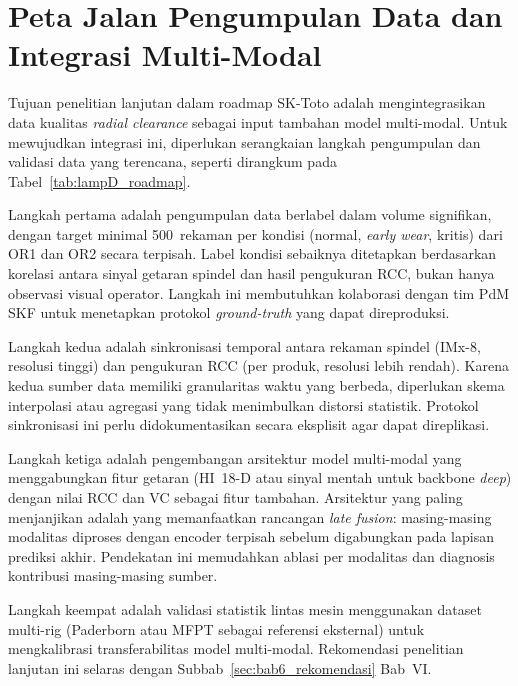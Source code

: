 \section{Peta Jalan Pengumpulan Data dan Integrasi Multi-Modal}
\label{lamp:skf_roadmap}

Tujuan penelitian lanjutan dalam roadmap SK-Toto adalah mengintegrasikan
data kualitas \emph{radial clearance} sebagai input tambahan model
multi-modal. Untuk mewujudkan integrasi ini, diperlukan serangkaian
langkah pengumpulan dan validasi data yang terencana, seperti dirangkum
pada Tabel~\ref{tab:lampD_roadmap}.

Langkah pertama adalah pengumpulan data berlabel dalam volume signifikan,
dengan target minimal 500~rekaman per kondisi (normal, \emph{early
wear}, kritis) dari OR1 dan OR2 secara terpisah. Label kondisi sebaiknya
ditetapkan berdasarkan korelasi antara sinyal getaran spindel dan hasil
pengukuran RCC, bukan hanya observasi visual operator. Langkah ini
membutuhkan kolaborasi dengan tim PdM SKF untuk menetapkan protokol
\emph{ground-truth} yang dapat direproduksi.

Langkah kedua adalah sinkronisasi temporal antara rekaman spindel
(IMx-8, resolusi tinggi) dan pengukuran RCC (per produk, resolusi lebih
rendah). Karena kedua sumber data memiliki granularitas waktu yang
berbeda, diperlukan skema interpolasi atau agregasi yang tidak
menimbulkan distorsi statistik. Protokol sinkronisasi ini perlu
didokumentasikan secara eksplisit agar dapat direplikasi.

Langkah ketiga adalah pengembangan arsitektur model multi-modal yang
menggabungkan fitur getaran (HI~18-D atau sinyal mentah untuk backbone
\emph{deep}) dengan nilai RCC dan VC sebagai fitur tambahan. Arsitektur
yang paling menjanjikan adalah yang memanfaatkan rancangan \emph{late
fusion}: masing-masing modalitas diproses dengan encoder terpisah
sebelum digabungkan pada lapisan prediksi akhir. Pendekatan ini
memudahkan ablasi per modalitas dan diagnosis kontribusi masing-masing
sumber.

Langkah keempat adalah validasi statistik lintas mesin menggunakan
dataset multi-rig (Paderborn atau MFPT sebagai referensi eksternal)
untuk mengkalibrasi transferabilitas model multi-modal. Rekomendasi
penelitian lanjutan ini selaras dengan Subbab~\ref{sec:bab6_rekomendasi}
Bab~VI.

